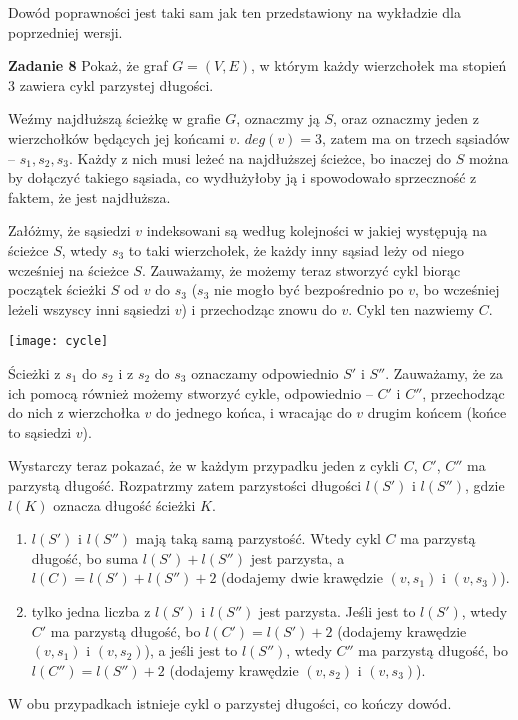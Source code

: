 \documentclass[12pt,a4paper]{article}
\begin{document}
Dowód poprawności jest taki sam jak ten przedstawiony na wykładzie dla poprzedniej wersji.

\newpage
\noindent
\textbf{Zadanie 8} Pokaż, że graf \(G=(V,E)\), w którym każdy wierzchołek ma stopień 3 zawiera cykl parzystej długości.
\vskip 0.2cm

Weźmy najdłuższą ścieżkę w grafie \(G\), oznaczmy ją \(S\), oraz oznaczmy jeden z wierzchołków będących jej końcami \(v\). \(deg(v) = 3\), zatem ma on trzech sąsiadów -- \(s_1,s_2,s_3\). Każdy z nich musi leżeć na najdłuższej ścieżce, bo inaczej do \(S\) można by dołączyć takiego sąsiada, co wydłużyłoby ją i spowodowało sprzeczność z faktem, że jest najdłuższa.

Załóżmy, że sąsiedzi \(v\) indeksowani są według kolejności w jakiej występują na ścieżce \(S\), wtedy \(s_3\) to taki wierzchołek, że każdy inny sąsiad leży od niego wcześniej na ścieżce \(S\). Zauważamy, że możemy teraz stworzyć cykl biorąc początek ścieżki \(S\) od \(v\) do \(s_3\) (\(s_3\) nie mogło być bezpośrednio po \(v\), bo wcześniej leżeli wszyscy inni sąsiedzi \(v\)) i przechodząc znowu do \(v\). Cykl ten nazwiemy \(C\).

\begin{center}
	\texttt{[image: cycle]}
\end{center}

Ścieżki z \(s_1\) do \(s_2\) i z \(s_2\) do \(s_3\) oznaczamy odpowiednio \(S'\) i \(S''\). Zauważamy, że za ich pomocą również możemy stworzyć cykle, odpowiednio -- \(C'\) i \(C''\),  przechodząc do nich z wierzchołka \(v\) do jednego końca, i wracając do \(v\) drugim końcem (końce to sąsiedzi \(v\)).

Wystarczy teraz pokazać, że w każdym przypadku jeden z cykli \(C\), \(C'\), \(C''\) ma parzystą długość. Rozpatrzmy zatem parzystości długości \(l(S')\) i \(l(S'')\), gdzie \(l(K)\) oznacza długość ścieżki \(K\).

\begin{enumerate}
	\item \(l(S')\) i \(l(S'')\) mają taką samą parzystość. Wtedy cykl \(C\) ma parzystą długość, 
	bo suma \(l(S') + l(S'')\) jest parzysta, a \(l(C) = l(S') + l(S'') + 2\) (dodajemy dwie
	krawędzie \( (v,s_1) \) i \( (v,s_3) \)).
	\item tylko jedna liczba z \(l(S')\) i \(l(S'')\) jest parzysta. Jeśli jest to \( l(S') \), 
	wtedy \( C' \) ma parzystą długość, bo \(l(C') = l(S') + 2\) (dodajemy krawędzie \( (v,s_1) \)
	i \( (v,s_2) \)), a jeśli jest to \( l(S'') \), wtedy \( C'' \) ma parzystą długość, bo 
	\(l(C'') = l(S'') + 2\) (dodajemy krawędzie \( (v,s_2) \) i \( (v,s_3) \)).
\end{enumerate}
W obu przypadkach istnieje cykl o parzystej długości, co kończy dowód.
\end{document}
